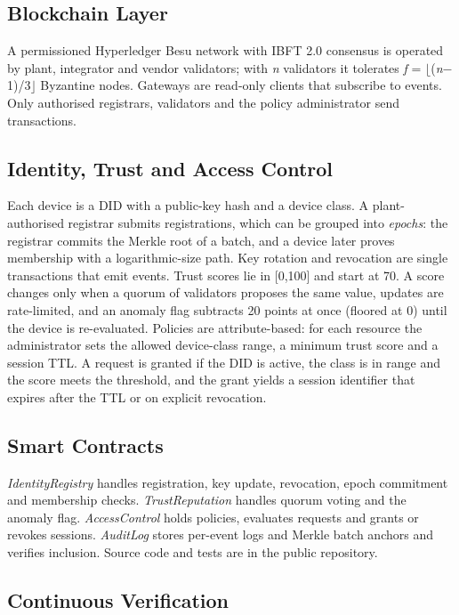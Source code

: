 \documentclass[a4paper,5p,times,twocolumn,number,sort&compress]{elsarticle}
\begin{document}
\subsection{Blockchain Layer}

A permissioned Hyperledger Besu network with IBFT 2.0 consensus is operated by plant, integrator and vendor validators; with \emph{n} validators it tolerates \emph{f} = $\lfloor$(\emph{n}$-$1)/3$\rfloor$ Byzantine nodes. Gateways are read-only clients that subscribe to events. Only authorised registrars, validators and the policy administrator send transactions.

\subsection{Identity, Trust and Access Control}

Each device is a DID with a public-key hash and a device class. A plant-authorised registrar submits registrations, which can be grouped into \emph{epochs}: the registrar commits the Merkle root of a batch, and a device later proves membership with a logarithmic-size path. Key rotation and revocation are single transactions that emit events. Trust scores lie in [0,100] and start at 70. A score changes only when a quorum of validators proposes the same value, updates are rate-limited, and an anomaly flag subtracts 20 points at once (floored at 0) until the device is re-evaluated. Policies are attribute-based: for each resource the administrator sets the allowed device-class range, a minimum trust score and a session TTL. A request is granted if the DID is active, the class is in range and the score meets the threshold, and the grant yields a session identifier that expires after the TTL or on explicit revocation.

\subsection{Smart Contracts}

\emph{IdentityRegistry} handles registration, key update, revocation, epoch commitment and membership checks. \emph{TrustReputation} handles quorum voting and the anomaly flag. \emph{AccessControl} holds policies, evaluates requests and grants or revokes sessions. \emph{AuditLog} stores per-event logs and Merkle batch anchors and verifies inclusion. Source code and tests are in the public repository.

\subsection{Continuous Verification}
\end{document}
